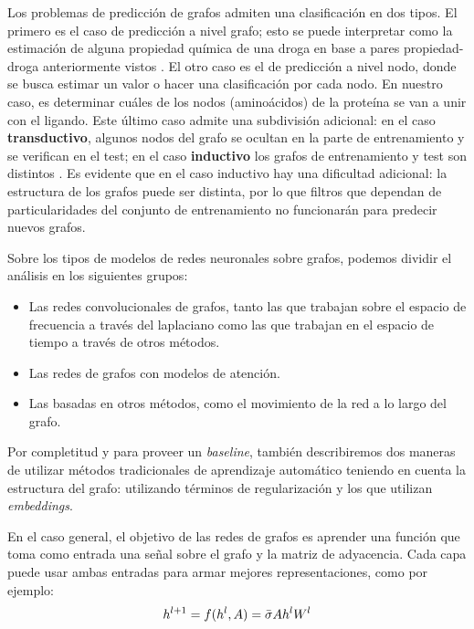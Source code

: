 \documentclass[
    left=2.0cm,         %
    right=2.0cm,        %
    top=2.0cm,          %
    bottom=2.5cm,         %
    bindingoffset=6mm,  %
    nohyphenation=false %
]{eiti/eiti-thesis}
\begin{document}
Los problemas de predicción de grafos admiten una clasificación en dos tipos. El primero
es el caso de predicción a nivel grafo; esto se puede interpretar como
la estimación de alguna propiedad química de una droga en base a pares propiedad-droga %
anteriormente vistos \cite{gilmer2017neuralmessagepassing}.
El otro caso es el de predicción a nivel nodo, donde se busca estimar un valor
o hacer una clasificación por cada nodo. En nuestro caso, es determinar cuáles
de los nodos (aminoácidos) de la proteína se van a unir con el ligando. Este último
caso admite una subdivisión adicional: en el caso \textbf{transductivo}, algunos
nodos del grafo se ocultan en la parte de entrenamiento y se verifican en el test; en el
caso \textbf{inductivo} los grafos de entrenamiento y test son distintos \cite{GAT}. Es%
evidente que en el caso inductivo hay una dificultad adicional: la estructura
de los grafos puede ser distinta, por lo que filtros que dependan de particularidades %
del conjunto de entrenamiento no funcionarán para predecir nuevos grafos. %

Sobre los tipos de modelos de redes neuronales sobre grafos, podemos dividir el
análisis en los siguientes grupos: 

\begin{itemize}  
\item Las redes convolucionales de grafos, tanto las que trabajan sobre el espacio
de frecuencia a través del laplaciano como las que trabajan en el espacio de tiempo
a través de otros métodos.
\item Las redes de grafos con modelos de atención.
\item Las basadas en otros métodos, como el movimiento de la red a lo largo del grafo.
\end{itemize}

Por completitud y para proveer un \textit{baseline}, también describiremos dos maneras
de utilizar métodos tradicionales de aprendizaje automático teniendo en cuenta la estructura
del grafo: utilizando términos de regularización y los que utilizan \textit{embeddings}.

En el caso general, el objetivo de las redes de grafos es aprender una función que toma
como entrada una señal sobre el grafo y la matriz de adyacencia\cite{kipf2016gcn}. 
Cada capa puede usar ambas entradas para armar mejores representaciones, 
como por ejemplo:
\begin{equation*}
    \Large
    h^{l+1} = f(h^l, A) = \bar\sigma A h^l W^l
\end{equation*}
\end{document}
